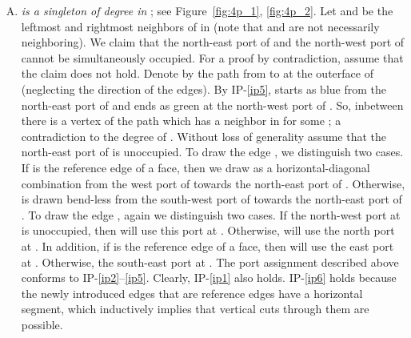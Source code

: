 \documentclass[a4paper,twoside,11pt]{article}
\begin{document}
\begin{enumerate}[C.1:]

\item \label{c:sing3} \emph{ is a singleton of
degree  in }; see Figure~\ref{fig:4p_1}, \ref{fig:4p_2}. Let
 and  be the leftmost and rightmost neighbors of  in
 (note that  and  are not necessarily
neighboring). We claim that the north-east port of  and the
north-west port of  cannot be simultaneously occupied. For a
proof by contradiction, assume that the claim does not hold. Denote
by  the path from  to  at
the outerface of  (neglecting the direction of the edges).
By IP-\ref{ip5},  starts as blue from
the north-east port of  and ends as green at the north-west
port of . So, inbetween there is a vertex of the path  which has a neighbor in  for some ; a contradiction to the degree of . Without loss of generality
assume that the north-east port of  is unoccupied. To draw
the edge , we distinguish two cases. If 
is the reference edge of a face, then we draw  as a
horizontal-diagonal combination from the west port of  towards
the north-east port of . Otherwise,  is drawn
bend-less from the south-west port of  towards the north-east 
port of . To draw the edge , again we distinguish
two cases. If the north-west port at  is unoccupied, then
 will use this port at . Otherwise,  will
use the north port at . In addition, if  is the
reference edge of a face, then  will use the east port at
. Otherwise, the south-east port at . The port assignment
described above conforms to IP-\ref{ip2}--\ref{ip5}. Clearly,
IP-\ref{ip1} also holds. IP-\ref{ip6} holds because the newly
introduced edges that are reference edges have a horizontal segment,
which inductively implies that vertical cuts through them are possible.


\end{enumerate}
\end{document}
